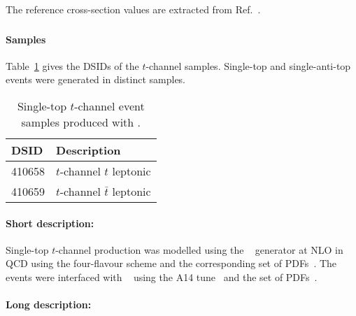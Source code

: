 The reference cross-section values are extracted from Ref.~\cite{LHCTopWGsgtopXsec}.


\subsubsection[Powheg+Pythia8]{\POWPY[8]}
\label{subsubsec:tchan_PP8}

\paragraph{Samples}

Table~\ref{tab:tchan_PP8} gives the DSIDs of the $t$-channel \POWPY[8] samples.
Single-top and single-anti-top events were generated in distinct samples.
\begin{table}[!htbp]
\begin{center}
\caption{Single-top $t$-channel event samples produced with \POWPY[8].} 
\label{tab:tchan_PP8}
\begin{tabular}{ l | l }
\hline
DSID & Description \\
\hline
410658 & $t$-channel $t$ leptonic \\
410659 & $t$-channel $\bar{t}$ leptonic \\
\hline
\end{tabular}
\end{center}
\end{table}

\paragraph{Short description:}

Single-top $t$-channel production was modelled using the
\POWHEGBOX[v2]~\cite{Frederix:2012dh,Nason:2004rx,Frixione:2007vw,Alioli:2010xd}
generator at NLO in QCD using the four-flavour scheme and the
corresponding \NNPDF[3.0nlo] set of PDFs~\cite{Ball:2014uwa}.  The events were
interfaced with \PYTHIA[8.230]~\cite{Sjostrand:2014zea} using the A14
tune~\cite{ATL-PHYS-PUB-2014-021} and the \NNPDF[2.3lo] set of
PDFs~\cite{Ball:2012cx}.



\paragraph{Long description:}

